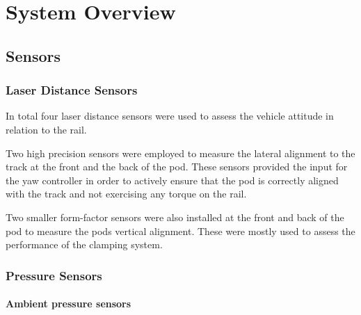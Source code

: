 
\chapter{System Overview}

\section{Sensors}


\subsection{Laser Distance Sensors}

In total four laser distance sensors were used to assess the vehicle attitude in relation to the rail.

Two high precision sensors were employed to measure the lateral alignment to the track at the front and the back of the pod. These sensors provided the input for the yaw controller in order to actively ensure that the pod is correctly aligned with the track and not exercising any torque on the rail.

Two smaller form-factor sensors were also installed at the front and back of the pod to measure the pods vertical alignment. These were mostly used to assess the performance of the clamping system.

\subsection{Pressure Sensors}

\subsubsection{Ambient pressure sensors}


